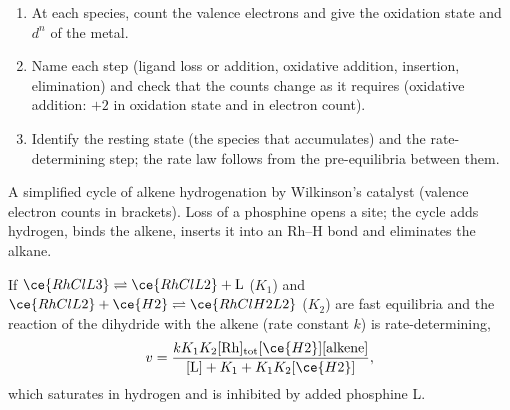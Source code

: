 \begin{method}\label{met:b3:homogeneous-catalysis:read-cycle}
\begin{enumerate}
  \item At each species, count the valence electrons and give the oxidation
        state and $d^n$ of the metal.
  \item Name each step (ligand loss or addition, oxidative addition,
        insertion, elimination) and check that the counts change as it requires
        (oxidative addition: $+2$ in oxidation state and in electron count).
  \item Identify the resting state (the species that accumulates) and the
        rate-determining step; the rate law follows from the pre-equilibria
        between them.
\end{enumerate}
\end{method}

\begin{omfigure}

{\small A simplified cycle of alkene hydrogenation by Wilkinson's catalyst
(valence electron counts in brackets). Loss of a phosphine opens a site; the
cycle adds hydrogen, binds the alkene, inserts it into an Rh--H bond and
eliminates the alkane.}
\end{omfigure}

\begin{proposition}\label{prop:b3:homogeneous-catalysis:wilkinson-rate}
If $\ce{RhClL3} \rightleftharpoons \ce{RhClL2} + \mathrm L$ ($K_1$) and $\ce{RhClL2} + \ce{H2} \rightleftharpoons \ce{RhClH2L2}$ ($K_2$) are fast
equilibria and the reaction of the dihydride with the alkene (rate constant $k$)
is rate-determining,
\[
  v = \frac{kK_1K_2[\mathrm{Rh}]_{\mathrm{tot}}[\ce{H2}][\text{alkene}]}{[\mathrm L] + K_1 + K_1K_2[\ce{H2}]},
\]
which saturates in hydrogen and is inhibited by added phosphine L.
\end{proposition}

